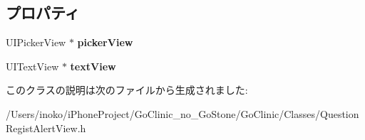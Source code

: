\subsection*{プロパティ}
\begin{DoxyCompactItemize}
\item 
\hypertarget{interface_question_regist_alert_view_a7a6b1d14ec4d4b0fb2f90f9540bbdfda}{
UIPickerView $\ast$ {\bfseries pickerView}}
\label{interface_question_regist_alert_view_a7a6b1d14ec4d4b0fb2f90f9540bbdfda}

\item 
\hypertarget{interface_question_regist_alert_view_ae44891cfd7df3d2b8048b71a1554cb6e}{
UITextView $\ast$ {\bfseries textView}}
\label{interface_question_regist_alert_view_ae44891cfd7df3d2b8048b71a1554cb6e}

\end{DoxyCompactItemize}


このクラスの説明は次のファイルから生成されました:\begin{DoxyCompactItemize}
\item 
/Users/inoko/iPhoneProject/GoClinic\_\-no\_\-GoStone/GoClinic/Classes/QuestionRegistAlertView.h\end{DoxyCompactItemize}
